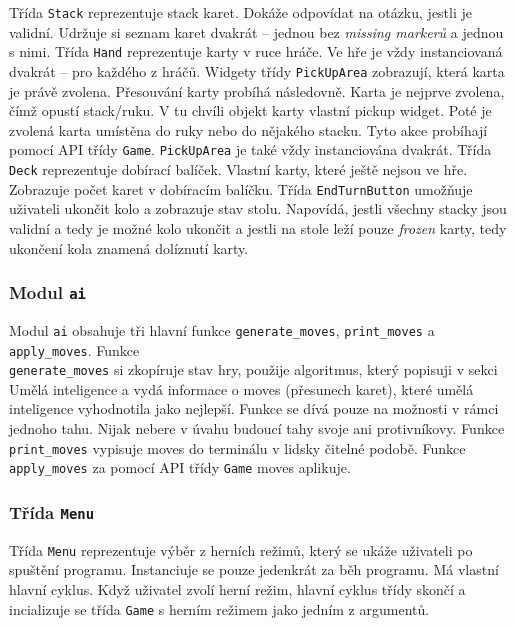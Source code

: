 \documentclass{article}
\begin{document}
Třída \texttt{Stack} reprezentuje stack karet. Dokáže odpovídat na otázku,
jestli je validní. Udržuje si seznam karet dvakrát -- jednou bez \emph{missing
markerů} a jednou s nimi. Třída \texttt{Hand} reprezentuje karty v ruce hráče.
Ve hře je vždy instanciovaná dvakrát -- pro každého z hráčů. Widgety třídy
\texttt{PickUpArea} zobrazují, která karta je právě zvolena. Přesouvání karty
probíhá následovně. Karta je nejprve zvolena, čímž opustí stack/ruku. V tu
chvíli objekt karty vlastní pickup widget. Poté je zvolená karta umístěna do
ruky nebo do nějakého stacku. Tyto akce probíhají pomocí API třídy
\texttt{Game}. \texttt{PickUpArea} je také vždy instanciována dvakrát. Třída
\texttt{Deck} reprezentuje dobírací balíček. Vlastní karty, které ještě nejsou
ve hře. Zobrazuje počet karet v dobíracím balíčku. Třída \texttt{EndTurnButton}
umožňuje uživateli ukončit kolo a zobrazuje stav stolu. Napovídá, jestli
všechny stacky jsou validní a tedy je možné kolo ukončit a jestli na stole leží
pouze \emph{frozen} karty, tedy ukončení kola znamená dolíznutí karty.

\subsubsection*{Modul \texttt{ai}}

Modul \texttt{ai} obsahuje tři hlavní funkce \texttt{generate\_moves},
\texttt{print\_moves} a \texttt{apply\_moves}. Funkce \\ \texttt{generate\_moves}
si zkopíruje stav hry, použije algoritmus, který popisuji v sekci Umělá
inteligence a vydá informace o moves (přesunech karet), které umělá inteligence
vyhodnotila jako nejlepší. Funkce se dívá pouze na možnosti v rámci jednoho
tahu. Nijak nebere v úvahu budoucí tahy svoje ani protivníkovy. Funkce
\texttt{print\_moves} vypisuje moves do terminálu v lidsky čitelné podobě.
Funkce \texttt{apply\_moves} za pomocí API třídy \texttt{Game} moves aplikuje.

\subsubsection*{Třída \texttt{Menu}}

Třída \texttt{Menu} reprezentuje výběr z herních režimů, který se ukáže
uživateli po spuštění programu. Instanciuje se pouze jedenkrát za běh programu.
Má vlastní hlavní cyklus. Když uživatel zvolí herní režim, hlavní cyklus třídy
skončí a incializuje se třída \texttt{Game} s herním režimem jako jedním z
argumentů.
\end{document}
